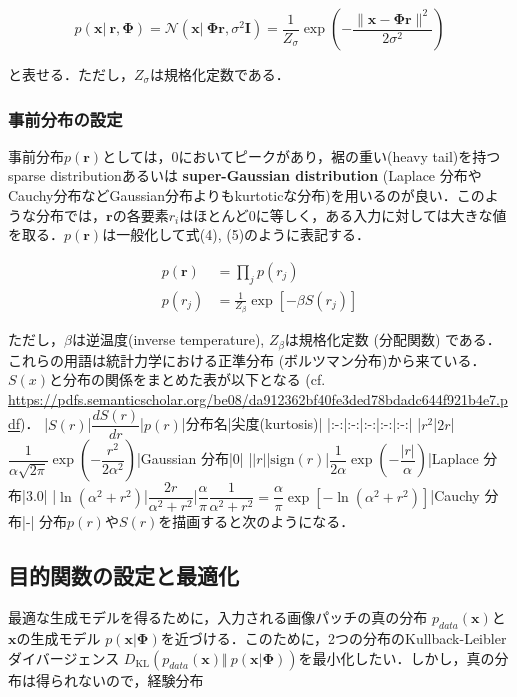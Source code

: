 \begin{equation}
p(\mathbf{x}|\ \mathbf{r}, \mathbf{\Phi})=\mathcal{N}\left(\mathbf{x}|\ \mathbf{\Phi} \mathbf{r}, \sigma^2 \mathbf{I} \right)=\frac{1}{Z_{\sigma}} \exp\left(-\frac{\|\mathbf{x} - \mathbf{\Phi} \mathbf{r}\|^2}{2\sigma^2}\right)
\end{equation}


と表せる．ただし，$Z_{\sigma}$は規格化定数である．
\subsubsection{事前分布の設定}
事前分布$p(\mathbf{r})$としては，0においてピークがあり，裾の重い(heavy tail)を持つsparse distributionあるいは \textbf{super-Gaussian distribution} (Laplace 分布やCauchy分布などGaussian分布よりもkurtoticな分布)を用いるのが良い．このような分布では，$\mathbf{r}$の各要素$r_i$はほとんど0に等しく，ある入力に対しては大きな値を取る．$p(\mathbf{r})$は一般化して式(4), (5)のように表記する．


\begin{align}
p(\mathbf{r})&=\prod_j p(r_j)\\
p(r_j)&=\frac{1}{Z_{\beta}}\exp \left[-\beta S(r_j)\right]
\end{align}


ただし，$\beta$は逆温度(inverse temperature), $Z_{\beta}$は規格化定数 (分配関数) である．これらの用語は統計力学における正準分布 (ボルツマン分布)から来ている．$S(x)$と分布の関係をまとめた表が以下となる (cf. \url{https://pdfs.semanticscholar.org/be08/da912362bf40fe3ded78bdadc644f921b4e7.pdf})．
|$S(r)$|$\dfrac{dS(r)}{dr}$|$p(r)$|分布名|尖度(kurtosis)|
|:-:|:-:|:-:|:-:|:-:|
|$r^2$|$2r$|$\dfrac{1}{\alpha \sqrt{2\pi}}\exp\left(-\dfrac{r^2}{2\alpha^2}\right)$|Gaussian 分布|0|
|$\vert r\vert$|$\text{sign}(r)$|$\dfrac{1}{2\alpha}\exp\left(-\dfrac{\vert r\vert}{\alpha}\right)$|Laplace 分布|3.0|
|$\ln (\alpha^2+r^2)$|$\dfrac{2r}{\alpha^2+r^2}$|$\dfrac{\alpha}{\pi}\dfrac{1}{\alpha^2+r^2}=\dfrac{\alpha}{\pi}\exp[-\ln (\alpha^2+r^2)]$|Cauchy 分布|-|
分布$p(r)$や$S(r)$を描画すると次のようになる．


\subsection{目的関数の設定と最適化}
最適な生成モデルを得るために，入力される画像パッチの真の分布 $p_{data}(\mathbf{x})$と$\mathbf{x}$の生成モデル $p(\mathbf{x}|\mathbf{\Phi})$を近づける．このために，2つの分布のKullback-Leibler ダイバージェンス $D_{\text{KL}}\left(p_{data}(\mathbf{x}) \Vert\ p(\mathbf{x}|\mathbf{\Phi})\right)$を最小化したい．しかし，真の分布は得られないので，経験分布 


